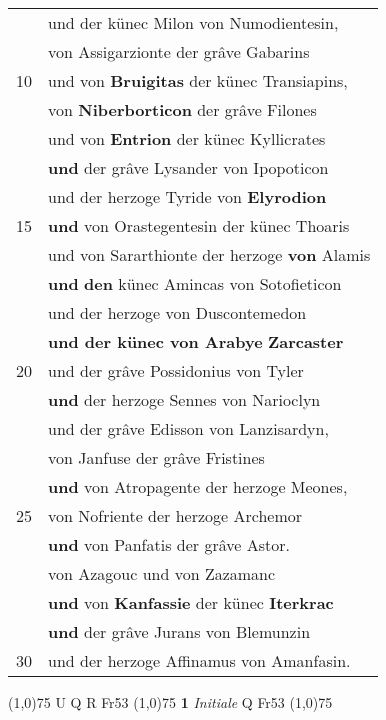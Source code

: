 \documentclass[8pt,a4paper,notitlepage]{article}
\begin{document}
\begin{table}[ht]
\begin{minipage}[t]{0.5\linewidth}
\begin{tabular}{rl}
 & und der künec Milon von Numodientesin,\\ 
 & von Assigarzionte der grâve Gabarins\\ 
10 & und von \textbf{Bruigitas} der künec Transiapins,\\ 
 & von \textbf{Niberborticon} der grâve Filones\\ 
 & und von \textbf{Entrion} der künec Kyllicrates\\ 
 & \textbf{und} der grâve Lysander von Ipopoticon\\ 
 & und der herzoge Tyride von \textbf{Elyrodion}\\ 
15 & \textbf{und} von Orastegentesin der künec Thoaris\\ 
 & und von Sararthionte der herzoge \textbf{von} Alamis\\ 
 & \textbf{und} \textbf{den} künec Amincas von Sotofieticon\\ 
 & und der herzoge von Duscontemedon\\ 
 & \textbf{und der künec von Arabye} \textbf{Zarcaster}\\ 
20 & und der grâve Possidonius von Tyler\\ 
 & \textbf{und} der herzoge Sennes von Narioclyn\\ 
 & und der grâve Edisson von Lanzisardyn,\\ 
 & von Janfuse der grâve Fristines\\ 
 & \textbf{und} von Atropagente der herzoge Meones,\\ 
25 & von Nofriente der herzoge Archemor\\ 
 & \textbf{und} von Panfatis der grâve Astor.\\ 
 & von Azagouc und von Zazamanc\\ 
 & \textbf{und} von \textbf{Kanfassie} der künec \textbf{Iterkrac}\\ 
 & \textbf{und} der grâve Jurans von Blemunzin\\ 
30 & und der herzoge Affinamus von Amanfasin.\\ 
\end{tabular}
\scriptsize
\line(1,0){75} \newline
U Q R Fr53 \newline
\line(1,0){75} \newline
\textbf{1} \textit{Initiale} Q Fr53  \newline
\line(1,0){75} \newline

\end{minipage}
\end{table}
\end{document}
